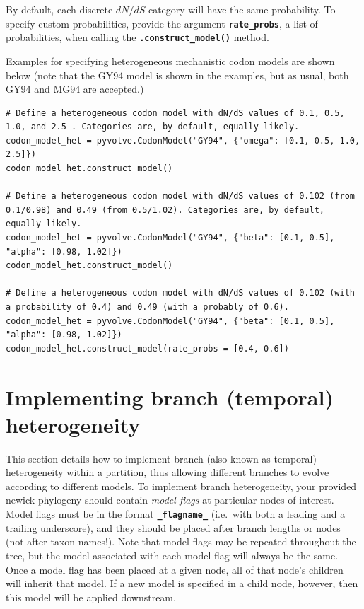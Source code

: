 \documentclass{article}
\newcommand{\code}[1]{\textbf{\texttt{\small{#1}}}}
\begin{document}
By default, each discrete $dN/dS$ category will have the same probability. To specify custom probabilities, provide the argument \code{rate\_probs}, a list of probabilities, when calling the \code{.construct\_model()} method.

Examples for specifying heterogeneous mechanistic codon models are shown below (note that the GY94 model is shown in the examples, but as usual, both GY94 and MG94 are accepted.)
\begin{lstlisting}
# Define a heterogeneous codon model with dN/dS values of 0.1, 0.5, 1.0, and 2.5 . Categories are, by default, equally likely.
codon_model_het = pyvolve.CodonModel("GY94", {"omega": [0.1, 0.5, 1.0, 2.5]})
codon_model_het.construct_model()

# Define a heterogeneous codon model with dN/dS values of 0.102 (from 0.1/0.98) and 0.49 (from 0.5/1.02). Categories are, by default, equally likely.
codon_model_het = pyvolve.CodonModel("GY94", {"beta": [0.1, 0.5], "alpha": [0.98, 1.02]})
codon_model_het.construct_model()

# Define a heterogeneous codon model with dN/dS values of 0.102 (with a probability of 0.4) and 0.49 (with a probably of 0.6).
codon_model_het = pyvolve.CodonModel("GY94", {"beta": [0.1, 0.5], "alpha": [0.98, 1.02]})
codon_model_het.construct_model(rate_probs = [0.4, 0.6])
\end{lstlisting}




\section{Implementing branch (temporal) heterogeneity}\label{sec:branchhet}

This section details how to implement branch (also known as temporal) heterogeneity within a partition, thus allowing different branches to evolve according to different models. To implement branch heterogeneity, your provided newick phylogeny should contain \emph{model flags} at particular nodes of interest. Model flags must be in the format \code{\_flagname\_} (i.e.\ with both a leading and a trailing underscore), and they should be placed after branch lengths or nodes (not after taxon names!). Note that model flags may be repeated throughout the tree, but the model associated with each model flag will always be the same. Once a model flag has been placed at a given node, all of that node's children will inherit that model. If a new model is specified in a child node, however, then this model will be applied downstream.
\end{document}

